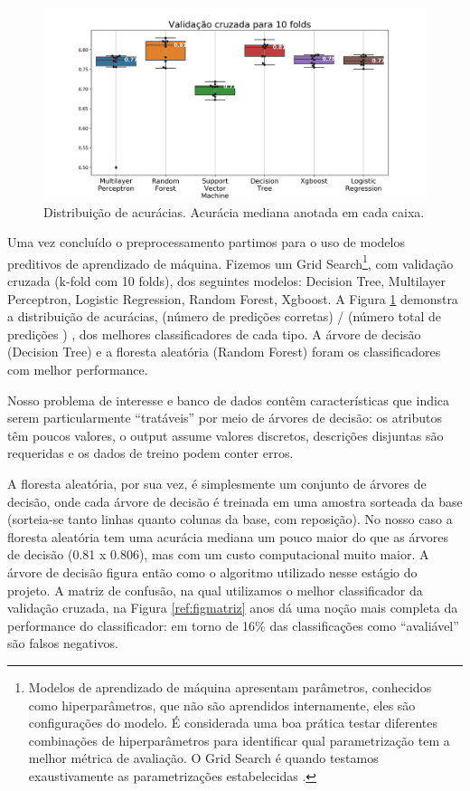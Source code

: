 \documentclass[
	12pt,				%
	openany,			%
	oneside,			%
	a4paper,			%
	english,			%
	french,				%
	spanish,			%
	brazil,				%
	]{abntex2}
\begin{document}
\begin{figure}[H]
  \includegraphics[scale=0.5]{img/cvs.png}
  \caption{Distribuição de acurácias. Acurácia mediana anotada em cada caixa.}
  \label{ref:figaccs}
\end{figure}

Uma vez concluído o preprocessamento partimos para o uso de modelos preditivos
de aprendizado de máquina. Fizemos um Grid Search\footnote{Modelos de
  aprendizado de máquina apresentam parâmetros, conhecidos como hiperparâmetros,
  que não são aprendidos internamente, eles são configura\c{c}ões do modelo. É
  considerada uma boa prática testar diferentes combinações de hiperparâmetros
  para identificar qual parametrização tem a melhor métrica de avaliação. O Grid
  Search é quando testamos exaustivamente as parametrizações estabelecidas
  \cite{geron2019hands}. }, com validação cruzada (k-fold com 10 folds), dos
seguintes modelos: Decision Tree, Multilayer Perceptron, Logistic Regression,
Random Forest, Xgboost. A Figura \ref{ref:figaccs} demonstra a distribuição de
acurácias, (número de predições corretas) / (número total de predições ) , dos
melhores classificadores de cada tipo. A árvore de decisão (Decision Tree) e a
floresta aleatória (Random Forest) foram os classificadores com melhor
performance.

Nosso problema de interesse e banco de dados contêm características que
 indica serem particularmente
``tratáveis'' por meio de árvores de decisão: os atributos têm poucos valores, o
output assume valores discretos, descri\c{c}ões disjuntas são requeridas e os
dados de treino podem conter erros.
  
A floresta aleatória, por sua vez, é simplesmente um conjunto de árvores de
decisão, onde cada árvore de decisão é treinada em uma amostra sorteada da base
(sorteia-se tanto linhas quanto colunas da base, com reposi\c{c}ão). No nosso
caso a floresta aleatória tem uma acurácia mediana um pouco maior do que as
árvores de decisão (0.81 x 0.806), mas com um custo computacional muito maior. A
árvore de decisão figura então como o algoritmo utilizado nesse estágio do
projeto. A matriz de confusão, na qual utilizamos o melhor classificador da
valida\c{c}ão cruzada, na Figura \ref{ref:figmatriz} anos dá uma no\c{c}ão mais
completa da performance do classificador: em torno de 16\% das
classifica\c{c}ões como ``avaliável'' são falsos negativos.
\end{document}
